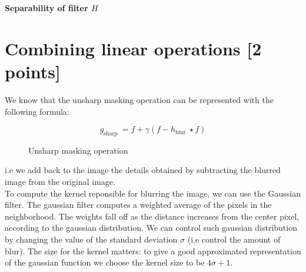 \documentclass[tikz,14pt,fleqn]{article}
\begin{document}
\textbf{Separability of filter $H$}\\


\section{Combining linear operations [2 points]}
We know that the unsharp masking operation can be represented with the following formula:
\begin{figure}[h!]
$$g_{\text {sharp }}=f+\gamma\left(f-h_{\text {blur }} \star f\right)$$
\caption{Unsharp masking operation}
\label{fig:2.1unsharpformula}
\end{figure}
i.e we add back to the image the details obtained by subtracting the blurred image from the original image.\\

To compute the kernel reponsible for blurring the image, we can use the Gaussian filter. The gaussian filter computes a weighted average of the pixels in the neighborhood. The weights fall off as the distance increases from the center pixel, according to the gaussian distribution. We can control such gaussian distribution by changing the value of the standard deviation $\sigma$ (i.e control the amount of blur). The size for the kernel matters: to give a good approximated representation of the gaussian function we choose the kernel size to be $4\sigma +1$.\\
\end{document}
